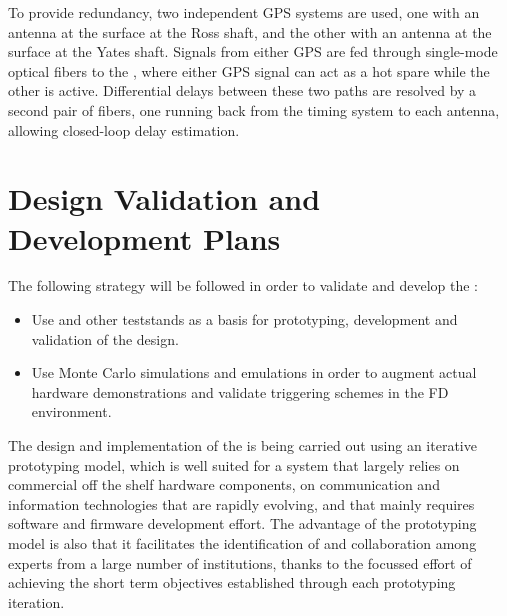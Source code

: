 To provide redundancy, two independent GPS systems are used,
one with an antenna at the surface at the Ross shaft, and the other
with an antenna at the surface at the Yates shaft. Signals from either
GPS are fed through single-mode optical fibers to the , where
either GPS signal can act as a hot spare while the other is active. 
Differential delays between these two paths are resolved by a second pair of fibers, one running back from the timing system to each antenna, allowing closed-loop delay estimation.


\section{Design Validation and Development Plans}
\label{sec:fd-daq:validation}

The following strategy will be followed in order to validate and
develop the   :
\begin{itemize}
\item Use  and other teststands as a basis for prototyping, development and validation
of the  design.
\item Use Monte Carlo simulations and emulations in order to augment actual hardware
demonstrations and validate triggering schemes in the FD environment.
\end{itemize}


The design and implementation of the  is being carried out using an iterative prototyping model, which is well suited for a system that largely relies on commercial off the shelf hardware components, on communication and information technologies that are rapidly evolving, and that mainly requires software and firmware development effort.
The advantage of the prototyping model is also that it facilitates the identification of and collaboration among experts from a large number of institutions, thanks to the focussed effort of achieving the short term objectives established through each prototyping iteration.

